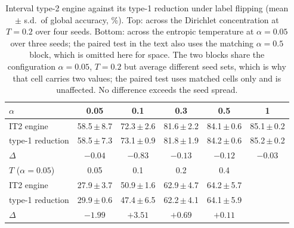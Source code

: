 \begin{table}[!t]
\centering
\caption{Interval type-2 engine against its type-1 reduction under label flipping (mean $\pm$ s.d.\ of global accuracy, \%). Top: across the Dirichlet concentration at $T=0.2$ over four seeds. Bottom: across the entropic temperature at $\alpha=0.05$ over three seeds; the paired test in the text also uses the matching $\alpha=0.5$ block, which is omitted here for space. The two blocks share the configuration $\alpha=0.05$, $T=0.2$ but average different seed sets, which is why that cell carries two values; the paired test uses matched cells only and is unaffected. No difference exceeds the seed spread.}
\label{tab:fou}
\setlength{\tabcolsep}{2.2pt}
\footnotesize
\begin{tabular}{lccccc}
\hline
$\alpha$ & 0.05 & 0.1 & 0.3 & 0.5 & 1\\
\hline
IT2 engine & 58.5\,$\pm$\,8.7 & 72.3\,$\pm$\,2.6 & 81.6\,$\pm$\,2.2 & 84.1\,$\pm$\,0.6 & 85.1\,$\pm$\,0.2\\
type-1 reduction & 58.5\,$\pm$\,7.3 & 73.1\,$\pm$\,0.9 & 81.8\,$\pm$\,1.9 & 84.2\,$\pm$\,0.6 & 85.2\,$\pm$\,0.2\\
$\Delta$ & $-0.04$ & $-0.83$ & $-0.13$ & $-0.12$ & $-0.03$\\
\hline
$T$ ($\alpha=0.05$) & 0.05 & 0.1 & 0.2 & 0.4 & \\
\hline
IT2 engine & 27.9\,$\pm$\,3.7 & 50.9\,$\pm$\,1.6 & 62.9\,$\pm$\,4.7 & 64.2\,$\pm$\,5.7 & \\
type-1 reduction & 29.9\,$\pm$\,0.6 & 47.4\,$\pm$\,6.5 & 62.2\,$\pm$\,4.1 & 64.1\,$\pm$\,5.9 & \\
$\Delta$ & $-1.99$ & $+3.51$ & $+0.69$ & $+0.11$ & \\
\hline
\end{tabular}
\end{table}
